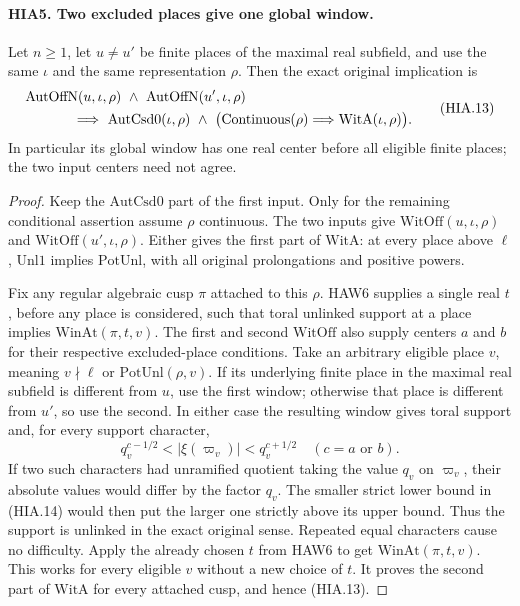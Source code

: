 \documentclass[11pt,a4paper]{article}
\numberwithin{equation}{section}
\theoremstyle{remark}\newtheorem{remark}[theorem]{Remark}
\begin{document}
\paragraph{HIA5. Two excluded places give one global window.}
\label{claim:HIA5}
Let \(n\geq1\), let \(u\ne u'\) be finite places of the
maximal real subfield, and use the same \(\iota\) and
the same representation \(\rho\).  Then the exact
original implication is
\[
 \begin{split}
 &\mathrm{AutOffN}(u,\iota,\rho)\ \wedge\
       \mathrm{AutOffN}(u',\iota,\rho)\\
 &\hspace{12mm}\Longrightarrow\
 \mathrm{AutCsd0}(\iota,\rho)\ \wedge\
       \bigl(\mathrm{Continuous}(\rho)\Longrightarrow
                                  \mathrm{WitA}(\iota,\rho)\bigr).
 \end{split}
 \tag{HIA.13}
\]
In particular its global window has one real center before
all eligible finite places; the two input centers need not agree.
\begin{proof}
Keep the \(\mathrm{AutCsd0}\) part of the first input.
Only for the remaining conditional assertion assume
\(\rho\) continuous.  The two inputs give
\(\mathrm{WitOff}(u,\iota,\rho)\) and
\(\mathrm{WitOff}(u',\iota,\rho)\).  Either gives the
first part of \(\mathrm{WitA}\): at every place above
\(\ell\), \(\mathrm{Unl1}\) implies
\(\mathrm{PotUnl}\), with all original prolongations
and positive powers.

Fix any regular algebraic cusp \(\pi\) attached to
this \(\rho\).  HAW6 supplies a single real \(t\),
before any place is considered, such that toral unlinked
support at a place implies \(\mathrm{WinAt}(\pi,t,v)\).
The first and second \(\mathrm{WitOff}\) also supply
centers \(a\) and \(b\) for their respective excluded-place
conditions.  Take an arbitrary eligible place \(v\), meaning
\(v\nmid\ell\) or \(\mathrm{PotUnl}(\rho,v)\).
If its underlying finite place in the maximal real subfield
is different from \(u\), use the first window; otherwise
that place is different from \(u'\),
so use the second.  In either case the resulting window
gives toral support and, for every support character,
\[
                    q_v^{c-1/2}<|\xi(\varpi_v)|<q_v^{c+1/2}
                     \quad(c=a\text{ or }b).
 \tag{HIA.14}
\]
If two such characters had unramified quotient taking the
value \(q_v\) on \(\varpi_v\), their absolute values
would differ by the factor \(q_v\).  The smaller strict
lower bound in (HIA.14) would then put the larger one
strictly above its upper bound.  Thus the support is
unlinked in the exact original sense.  Repeated equal
characters cause no difficulty.  Apply the already chosen
\(t\) from HAW6 to get \(\mathrm{WinAt}(\pi,t,v)\).
This works for every eligible \(v\) without a new choice
of \(t\).  It proves the second part of \(\mathrm{WitA}\)
for every attached cusp, and hence (HIA.13).
\end{proof}
\end{document}
